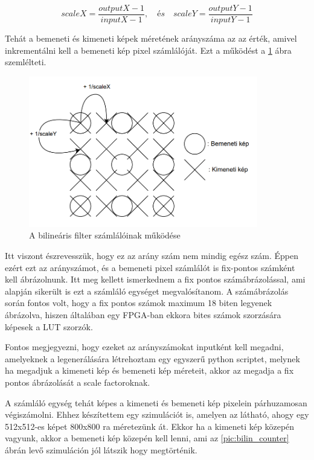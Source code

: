 \begin{equation}
	scaleX=\frac{outputX-1}{inputX-1}, \quad és \quad scaleY=\frac{outputY-1}{inputY-1}
\end{equation}

Tehát a bemeneti és kimeneti képek méretének arányszáma az az érték, amivel inkrementálni kell a bemeneti kép pixel számlálóját. Ezt a működést a \ref{pic:bilinear_abra} ábra szemlélteti.

\begin{figure}[!ht]
	\centering
	\includegraphics[width=100mm, keepaspectratio]{figures/bilinear_abra.png}
	\caption{A bilineáris filter számlálóinak működése} 
	\label{pic:bilinear_abra}
\end{figure}
\newpage
 Itt viszont észrevesszük, hogy ez az arány szám nem mindig egész szám. Éppen ezért ezt az arányszámot, és a bemeneti pixel számlálót is fix-pontos számként kell ábrázolnunk. Itt meg kellett ismerkednem a fix pontos számábrázolással, ami alapján sikerült is ezt a számláló egységet megvalósítanom. A számábrázolás során fontos volt, hogy a fix pontos számok maximum 18 biten legyenek ábrázolva, hiszen általában egy FPGA-ban ekkora bites számok szorzására képesek a LUT szorzók.

Fontos megjegyezni, hogy ezeket az arányszámokat inputként kell megadni, amelyeknek a legenerálására létrehoztam egy egyszerű python scriptet, melynek ha megadjuk a kimeneti kép és bemeneti kép méreteit, akkor az megadja a fix pontos ábrázolását a scale factoroknak.

A számláló egység tehát képes a kimeneti és bemeneti kép pixelein párhuzamosan végiszámolni. Ehhez készítettem egy szimulációt is, amelyen az látható, ahogy egy 512x512-es képet 800x800 ra méretezünk át. Ekkor ha a kimeneti kép közepén vagyunk, akkor a bemeneti kép közepén kell lenni, ami az \ref{pic:bilin_counter} ábrán levő szimuláción jól látszik hogy megtörténik.

